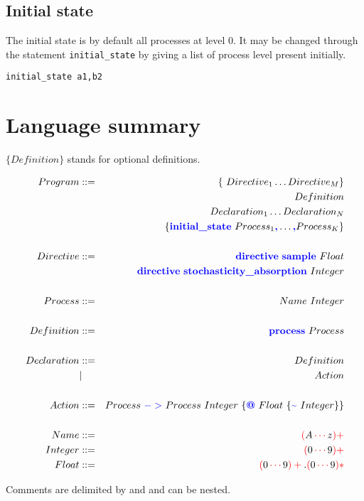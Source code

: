 \documentclass[11pt]{article}
\newcommand{\term}[1]{\text{\color{blue}\textbf{#1}}}
\newcommand{\regexp}[1]{{\color{red}#1}}
\newcommand{\ch}[1]{{\color{black}#1}}
\begin{document}
\subsection{Initial state}

The initial state is by default all processes at level 0.
It may be changed through the statement \verb|initial_state| by giving a list of process level present initially.

\begin{verbatim}
initial_state a1,b2
\end{verbatim}


\newpage
\section{Language summary}

$\{ Definition \}$ stands for optional definitions.

\begin{eqnarray*}
Program &::=& \{ Directive_1 \dots Directive_M \}\\
&& Definition \\
&& Declaration_1 \dots Declaration_N\\
&& \{ \term{initial\_state}~Process_1\term{,}\dots\term{,} Process_K \}\\
\\
Directive &::=& \term{directive}~\term{sample}~Float \\
&& \term{directive}~\term{stochasticity\_absorption}~Integer\\
\\
Process &::=& Name~Integer\\
\\
Definition &::=& \term{process}~Process\\
\\
Declaration &::=& Definition \\
& | & Action\\
\\
Action &::=& Process~\term{$->$}~Process~Integer~\{\term{@}~Float~\{\term{\textasciitilde}~Integer\}\}\\
\\
Name & ::= & \regexp{(\ch{A}\cdots \ch{z})+}\\
Integer & ::= & \regexp{(\ch{0}\cdots \ch{9})+}\\
Float & ::= & \regexp{(\ch{0}\cdots \ch{9})+ \ch{.} (\ch{0}\cdots \ch{9})*}\\
\end{eqnarray*}

Comments are delimited by \term{(*} and \term{*)} and can be nested.
\end{document}
